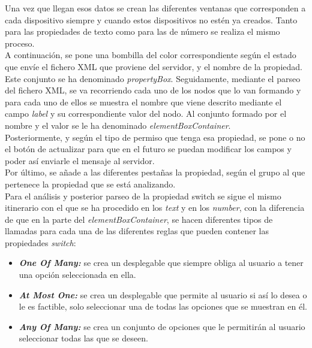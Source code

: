 Una vez que llegan esos datos se crean las diferentes ventanas que corresponden a cada dispositivo siempre y cuando estos dispositivos no estén ya creados.
Tanto para las propiedades de texto como para las de número se realiza el mismo proceso.\\

A continuación, se pone una bombilla del color correspondiente según el estado que envíe el fichero XML que proviene del servidor, y el nombre de la propiedad. Este conjunto se ha denominado \textit{propertyBox}.
Seguidamente, mediante el parseo del fichero XML, se va recorriendo cada uno de los nodos que lo van formando y para cada uno de ellos se muestra el nombre que viene descrito mediante el campo \textit{label} y su correspondiente valor del nodo. Al conjunto formado por el nombre y el valor se le ha denominado \textit{elementBoxContainer}.\\

Posteriormente, y según el tipo de permiso que tenga esa propiedad, se pone o no el botón de actualizar para que en el futuro se puedan modificar los campos y poder así enviarle el mensaje al servidor.\\

Por último, se añade a las diferentes pestañas la propiedad, según el grupo al que pertenece la propiedad que se está analizando.\\

Para el análisis y posterior parseo de la propiedad switch se sigue el mismo itinerario con el que se ha procedido en los \textit{text} y en los \textit{number}, con la diferencia de que en la parte del \textit{elementBoxContainer}, se hacen diferentes tipos de llamadas para cada una de las diferentes reglas  que pueden contener las propiedades \textit{switch}:
\begin{itemize}
  \item \textbf{\textit{One Of Many:}} se crea un desplegable que siempre obliga al usuario a tener una opción seleccionada en ella.
  \item \textbf{\textit{At Most One:}} se crea un desplegable que permite al usuario si así lo desea o le es factible, solo seleccionar una de todas las opciones que se muestran en él.
  \item \textbf{\textit{Any Of Many:}} se crea un conjunto de opciones que le permitirán al usuario seleccionar todas las que se deseen.
\end{itemize}
